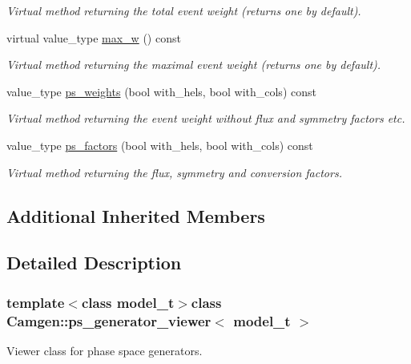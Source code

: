 \begin{DoxyCompactItemize}
\begin{DoxyCompactList}\small\item\em Virtual method returning the total event weight (returns one by default). \end{DoxyCompactList}\item 
\hypertarget{a00444_a2f73df9706ecf606b7736f0b83c41447}{virtual value\-\_\-type \hyperlink{a00444_a2f73df9706ecf606b7736f0b83c41447}{max\-\_\-w} () const }\label{a00444_a2f73df9706ecf606b7736f0b83c41447}

\begin{DoxyCompactList}\small\item\em Virtual method returning the maximal event weight (returns one by default). \end{DoxyCompactList}\item 
value\-\_\-type \hyperlink{a00444_a6267546a599d6429828c6924d2c3016a}{ps\-\_\-weights} (bool with\-\_\-hels, bool with\-\_\-cols) const 
\begin{DoxyCompactList}\small\item\em Virtual method returning the event weight without flux and symmetry factors etc. \end{DoxyCompactList}\item 
value\-\_\-type \hyperlink{a00444_ae5f3a092fb081ed7ec4250f1b8780c1d}{ps\-\_\-factors} (bool with\-\_\-hels, bool with\-\_\-cols) const 
\begin{DoxyCompactList}\small\item\em Virtual method returning the flux, symmetry and conversion factors. \end{DoxyCompactList}\end{DoxyCompactItemize}
\subsection*{Additional Inherited Members}


\subsection{Detailed Description}
\subsubsection*{template$<$class model\-\_\-t$>$class Camgen\-::ps\-\_\-generator\-\_\-viewer$<$ model\-\_\-t $>$}

Viewer class for phase space generators. 


